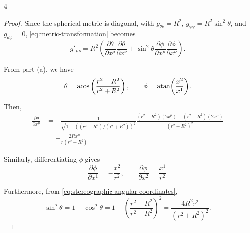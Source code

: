 \documentclass[11pt]{article}
\begin{document}
\begin{problem}{4}
\begin{enumerate}[label=(\alph*)]
\begin{proof}
    Since the spherical metric is diagonal, with
    \( g_{\theta\theta} = R^2 \),
    \( g_{\phi\phi} = R^2\sin^2\theta \), and
    \( g_{\theta\phi} = 0 \), \cref{eq:metric-transformation}
    becomes
    \begin{equation}
        \label{eq:metric-transformation-explicit}
        g'_{\mu\nu}
        = R^2\left(
            \frac{\partial\theta}{\partial x^{\mu}}
            \frac{\partial\theta}{\partial x^{\nu}}
            + \sin^2\theta
            \frac{\partial\phi}{\partial x^{\mu}}
            \frac{\partial\phi}{\partial x^{\nu}}
        \right).
    \end{equation}

    From part (a), we have
    \begin{equation}
        \label{eq:stereographic-angular-coordinates}
        \theta
        = \acos\left(\frac{r^2-R^2}{r^2+R^2}\right),
        \qquad
        \phi = \atan(\frac{x^2}{x^{1}}).
    \end{equation}

    Then,
    \begin{equation}
        \label{eq:theta-stereographic-derivatives}
        \begin{aligned}
        \frac{\partial\theta}{\partial x^{\mu}} &= - \frac{1}{\sqrt{1-((r^2 - R^2)/(r^2 + R^2))^2}} \frac{(r^2 + R^2)(2x^\mu) - (r^2 - R^2)(2x^{\mu})}{(r^2 + R^2)^2} \\
            &=-\frac{2Rx^{\mu}}{r(r^2+R^2)}
        \end{aligned}
    \end{equation}

    Similarly, differentiating \(\phi\) gives
    \begin{equation}
        \label{eq:phi-stereographic-derivatives}
        \frac{\partial\phi}{\partial x^1}
        = -\frac{x^2}{r^2},
        \qquad
        \frac{\partial\phi}{\partial x^2}
        = \frac{x^1}{r^2}.
    \end{equation}

    Furthermore, from \cref{eq:stereographic-angular-coordinates},
    \begin{equation}
        \label{eq:sin-theta-stereographic}
        \sin^2\theta
        = 1-\cos^2\theta
        = 1-\left(\frac{r^2-R^2}{r^2+R^2}\right)^2
        = \frac{4R^2r^2}{(r^2+R^2)^2}.
    \end{equation}


\end{proof}
\end{enumerate}
\end{problem}
\end{document}
